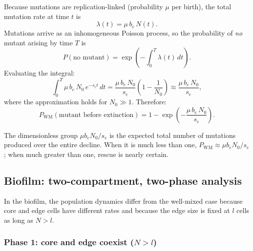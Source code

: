 \documentclass[12pt]{article}
\newcommand{\Nzero}{N_0}
\newcommand{\sEdge}{s_e}
\newcommand{\bEdge}{b_e}
\begin{document}
Because mutations are replication-linked (probability $\mu$ per birth),
the total mutation rate at time $t$ is
\begin{equation}
    \lambda(t) = \mu\, \bEdge\, N(t).
\end{equation}
Mutations arrive as an inhomogeneous Poisson process, so the probability of
\emph{no} mutant arising by time $T$ is
\begin{equation}
    P(\text{no mutant}) = \exp\!\left(-\int_0^T \lambda(t)\, dt\right).
\end{equation}
Evaluating the integral:
\begin{equation}
    \int_0^T \mu\, \bEdge\, \Nzero\, e^{-\sEdge t}\, dt
    = \frac{\mu\, \bEdge\, \Nzero}{\sEdge}
      \left(1 - \frac{1}{\Nzero}\right)
    \approx \frac{\mu\, \bEdge\, \Nzero}{\sEdge},
\end{equation}
where the approximation holds for $\Nzero \gg 1$. Therefore:
\begin{equation}
    \boxed{P_{\text{WM}}(\text{mutant before extinction})
    = 1 - \exp\!\!\left(-\frac{\mu\, \bEdge\, \Nzero}{\sEdge}\right).}
    \label{eq:p_wm}
\end{equation}

The dimensionless group $\mu \bEdge \Nzero / \sEdge$ is the expected total
number of mutations produced over the entire decline. When it is much less
than one, $P_{\text{WM}} \approx \mu \bEdge \Nzero / \sEdge$; when much
greater than one, rescue is nearly certain.

\subsection{Biofilm: two-compartment, two-phase analysis}
\label{sec:biofilm_approx}

In the biofilm, the population dynamics differ from the well-mixed case
because core and edge cells have different rates and because the edge size
is fixed at $l$ cells as long as $N > l$.

\subsubsection*{Phase 1: core and edge coexist ($N > l$)}
\end{document}
